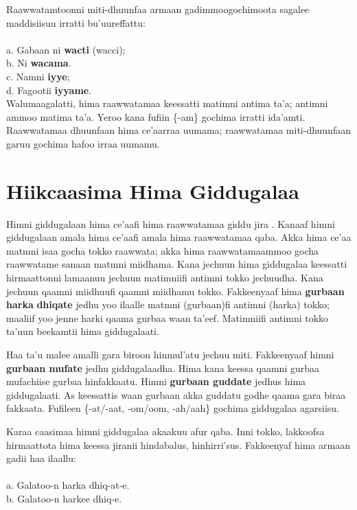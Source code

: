 \documentclass[11pt,b5paper]{book}
\begin{document}
Raawwatamtoonni miti-dhuunfaa armaan gadimmoogochimoota sagalee maddisiisuu irratti bu’uureffattu:\\
\\
a. Gabaan ni \textbf{wacti} (wacci);\\
b. Ni \textbf{wacama}.\\
c. Namni \textbf{iyye}; \\
d. Fagootii \textbf{iyyame}.\\

Walumaagalatti, hima raawwatamaa keessatti matimni antima ta’a; antimni ammoo matima ta’a. Yeroo kana fufiin \{-am\} gochima irratti ida’amti. Raawwatamaa dhuunfaan hima ce’aarraa uumama; raawwatamaa miti-dhuunfaan garuu gochima hafoo irraa uumamu. 

\section{Hiikcaasima Hima Giddugalaa}

Himni giddugalaan hima ce’aafi hima raawwatamaa giddu jira \cite{kemmer1993middle,tolemariam2009}. Kanaaf himni giddugalaan amala hima ce’aafi amala hima raawwatamaa qaba. Akka hima ce’aa matmni isaa gocha tokko raawwata; akka hima raawwatamaammoo gocha raawwatame sanaan matmni miidhama. Kana jechuun hima giddugalaa keessatti hirmaattonni lamaanuu jechuun matimniifi antimni tokko jechuudha. Kana jechuun qaamni miidhuufi qaamni miidhamu tokko. Fakkeenyaaf hima \textbf{gurbaan harka} \textbf{dhiqate} jedhu yoo ilaalle matmni (gurbaan)fi antimni (harka) tokko; maaliif yoo jenne harki qaama gurbaa waan ta’eef.
Matimniifi antimni tokko ta’uun beekamtii hima giddugalaati. 

Haa ta’u malee amalli gara biroon hinmul’atu jechuu miti. Fakkeenyaaf himni \textbf{gurbaan mufate} jedhu giddugalaadha. Hima kana keessa qaamni gurbaa mufachiise gurbaa hinfakkaatu. Himni \textbf{gurbaan guddate }jedhus hima giddugalaati. As keessattis waan gurbaan akka guddatu godhe
qaama gara biraa fakkaata. Fufileen \{-at/-aat, -om/oom, -ah/aah\} gochima giddugalaa agarsiisu.

Karaa caasimaa himni giddugalaa akaakuu afur qaba. Inni
tokko, lakkoofsa hirmaattota hima keessa jiranii hindabalus,
hinhirri’sus. Fakkeenyaf hima armaan gadii haa ilaallu: \\
\\
a. Galatoo-n harka dhiq-at-e.\\
b. Galatoo-n harkee dhiq-e.\\
\end{document}
